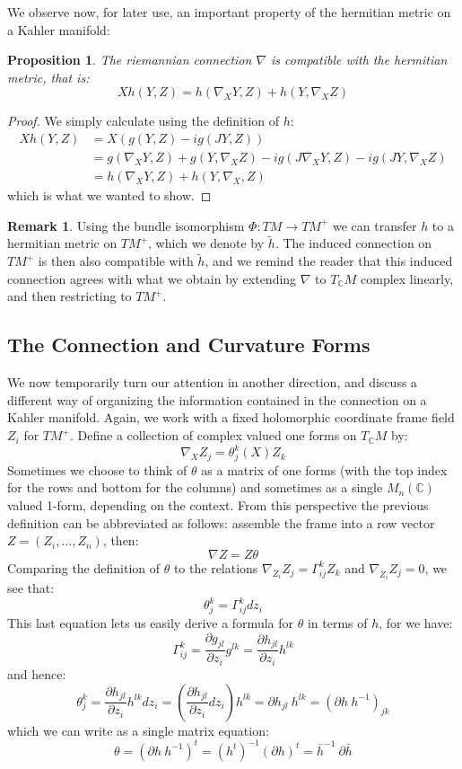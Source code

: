 \documentclass[11pt]{amsart}
\newtheorem{prop}[subsection]{Proposition}
\theoremstyle{definition}
\newtheorem{remark}[subsection]{Remark}
\def \C{ \mathbb{C} }
\def \del{ \partial }
\def \hsquig{ \tilde{h} }
\begin{document}
 We observe now, for later use, an important property of the hermitian metric on a Kahler manifold:
%
\begin{prop} The riemannian connection $\nabla$ is compatible with the hermitian metric, that is:
%
$$ X h( Y,Z ) = h( \nabla_X Y, Z ) + h( Y, \nabla_X Z ) $$
%
\end{prop}
%
\begin{proof}
We simply calculate using the definition of $h$:
%
\begin{align*}
X h(Y,Z) &= X( g(Y,Z) - i g( JY, Z ) ) \\
&= g( \nabla_X Y, Z ) + g( Y, \nabla_X Z ) - i g( J \nabla_X Y, Z ) - i g( JY, \nabla_X Z ) \\
&= h( \nabla_X Y, Z ) + h( Y, \nabla_X, Z)
\end{align*}
%
which is what we wanted to show.
%
\end{proof}
%
\begin{remark} Using the bundle isomorphism $\Phi : TM \rightarrow TM^{+}$ we can transfer $h$ to a hermitian metric on $TM^{+}$, which we denote by $\hsquig$. The induced connection on $TM^{+}$ is then also compatible with $\hsquig$, and we remind the reader that this induced connection agrees with what we obtain by extending $\nabla$ to $T_{\C}M$ complex linearly, and then restricting to $TM^{+}$.
\end{remark}

\subsection{ The Connection and Curvature Forms }

We now temporarily turn our attention in another direction, and discuss a different way of organizing the information contained in the connection on a Kahler manifold.  Again, we work with a fixed holomorphic coordinate frame field $Z_i$ for $TM^{+}$.  Define a collection of complex valued one forms on $T_{\C}M$ by:
%
$$ \nabla_{X} Z_j = \theta^k_j (X) Z_k $$
%
Sometimes we choose to think of $\theta$ as a matrix of one forms (with the top index for the rows and bottom for the columns) and sometimes as a single $M_n(\C)$ valued 1-form, depending on the context.  From this perspective the previous definition can be abbreviated as follows: assemble the frame into a row vector $Z = (Z_i, \ldots, Z_n)$, then:
%
$$ \nabla Z = Z \theta $$
%
Comparing the definition of $\theta$ to the relations $ \nabla_{Z_i} Z_j = \Gamma_{ij}^k Z_k $ and $\nabla_{\bar{Z}_i} Z_j = 0$, we see that:
%
$$ \theta^k_j = \Gamma_{ij}^k d z_i $$
%
This last equation lets us easily derive a formula for $\theta$ in terms of $h$, for we have:
%
$$ \Gamma_{ij}^k = \frac{ \del g_{jl} }{ \del z_i } g^{lk} = \frac{ \del h_{jl} }{ \del z_i } h^{lk} $$
%
and hence:
%
$$ \theta^k_j = \frac{ \del h_{jl} }{ \del z_i } h^{lk} d z_i = \left( \frac{ \del h_{jl} }{ \del z_i } d z_i \right) h^{lk} = \del h_{jl} \ h^{lk} = ( \del h \ h^{-1} )_{jk} $$
%
which we can write as a single matrix equation:
%
$$ \theta = ( \del h \ h^{-1} )^{t} = (h^t)^{-1} (\del h)^{t} = \bar{h}^{-1} \ \del \bar{h} $$
\end{document}
